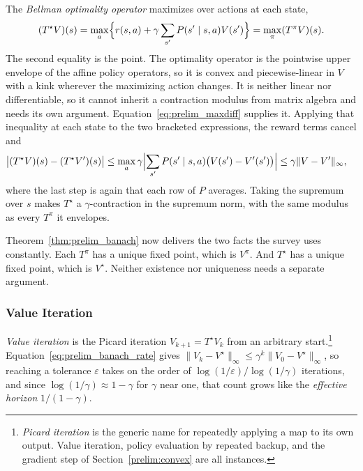 The \emph{Bellman optimality operator} maximizes over actions at each state,
\begin{equation}
(T^\star V)(s) = \max_{a} \Bigl\{ r(s,a) + \gamma \sum_{s'} P(s' \mid s,a) V(s') \Bigr\}
= \max_{\pi} (T^\pi V)(s).
\label{eq:prelim_tstar}
\end{equation}
The second equality is the point. The optimality operator is the pointwise upper envelope of the affine policy operators, so it is convex and piecewise-linear in $V$ with a kink wherever the maximizing action changes. It is neither linear nor differentiable, so it cannot inherit a contraction modulus from matrix algebra and needs its own argument. Equation~\eqref{eq:prelim_maxdiff} supplies it. Applying that inequality at each state to the two bracketed expressions, the reward terms cancel and
\begin{align*}
\bigl|(T^\star V)(s) - (T^\star V')(s)\bigr|
  &\leq \max_a \gamma \Bigl| \sum_{s'} P(s' \mid s,a)\bigl(V(s') - V'(s')\bigr) \Bigr|
  \leq \gamma \|V - V'\|_\infty ,
\end{align*}
where the last step is again that each row of $P$ averages. Taking the supremum over $s$ makes $T^\star$ a $\gamma$-contraction in the supremum norm, with the same modulus as every $T^\pi$ it envelopes.

Theorem~\ref{thm:prelim_banach} now delivers the two facts the survey uses constantly. Each $T^\pi$ has a unique fixed point, which is $V^\pi$. And $T^\star$ has a unique fixed point, which is $V^\star$. Neither existence nor uniqueness needs a separate argument.

\subsubsection{Value Iteration}

\emph{Value iteration} is the Picard iteration $V_{k+1} = T^\star V_k$ from an arbitrary start.\footnote{\emph{Picard iteration} is the generic name for repeatedly applying a map to its own output. Value iteration, policy evaluation by repeated backup, and the gradient step of Section~\ref{prelim:convex} are all instances.} Equation~\eqref{eq:prelim_banach_rate} gives $\|V_k - V^\star\|_\infty \leq \gamma^k \|V_0 - V^\star\|_\infty$, so reaching a tolerance $\varepsilon$ takes on the order of $\log(1/\varepsilon) / \log(1/\gamma)$ iterations, and since $\log(1/\gamma) \approx 1 - \gamma$ for $\gamma$ near one, that count grows like the \emph{effective horizon} $1/(1-\gamma)$.

